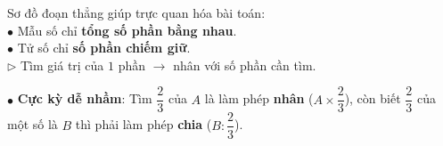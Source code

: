 \documentclass[14pt,a4paper,oneside]{extbook}
\begin{document}
\noindent
\begin{minipage}[t]{0.54\textwidth}
  \begin{tcolorbox}[
    enhanced,
    title={\footnotesize\bfseries\color{white}\faPencil\ Vũ khí vẽ sơ đồ đoạn thẳng},
    colback=green!3!white,
    colframe=green!60!black,
    arc=2.5mm, boxrule=0.8pt, top=1.8mm, bottom=1.8mm, left=2.2mm, right=2.2mm
  ]
    \footnotesize
    Sơ đồ đoạn thẳng giúp trực quan hóa bài toán:\\
    $\bullet$ Mẫu số chỉ \textbf{tổng số phần bằng nhau}.\\
    $\bullet$ Tử số chỉ \textbf{số phần chiếm giữ}.\\
    $\triangleright$ Tìm giá trị của $1$ phần $\rightarrow$ nhân với số phần cần tìm.
  \end{tcolorbox}
\end{minipage}%
\hfill
\begin{minipage}[t]{0.44\textwidth}
  \begin{tcolorbox}[
    enhanced,
    title={\footnotesize\bfseries\color{white}\faExclamationTriangle\ Mẹo tránh bẫy trắc nghiệm},
    colback=red!2!white,
    colframe=red!70!black,
    arc=2.5mm, boxrule=0.8pt, top=1.8mm, bottom=1.8mm, left=2.2mm, right=2.2mm
  ]
    \footnotesize
    $\bullet$ \textbf{Cực kỳ dễ nhầm}: Tìm $\dfrac{2}{3}$ của $A$ là làm phép \textbf{nhân} ($A \times \dfrac{2}{3}$), còn biết $\dfrac{2}{3}$ của một số là $B$ thì phải làm phép \textbf{chia} ($B : \dfrac{2}{3}$).
  \end{tcolorbox}
\end{minipage}
\end{document}
